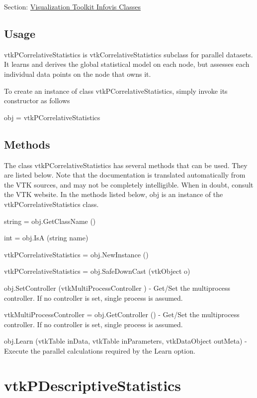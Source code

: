 Section\-: \hyperlink{sec_vtkinfovis}{Visualization Toolkit Infovis Classes} \hypertarget{vtkwidgets_vtkxyplotwidget_Usage}{}\subsection{Usage}\label{vtkwidgets_vtkxyplotwidget_Usage}
vtk\-P\-Correlative\-Statistics is vtk\-Correlative\-Statistics subclass for parallel datasets. It learns and derives the global statistical model on each node, but assesses each individual data points on the node that owns it.

To create an instance of class vtk\-P\-Correlative\-Statistics, simply invoke its constructor as follows \begin{DoxyVerb}  obj = vtkPCorrelativeStatistics
\end{DoxyVerb}
 \hypertarget{vtkwidgets_vtkxyplotwidget_Methods}{}\subsection{Methods}\label{vtkwidgets_vtkxyplotwidget_Methods}
The class vtk\-P\-Correlative\-Statistics has several methods that can be used. They are listed below. Note that the documentation is translated automatically from the V\-T\-K sources, and may not be completely intelligible. When in doubt, consult the V\-T\-K website. In the methods listed below, {\ttfamily obj} is an instance of the vtk\-P\-Correlative\-Statistics class. 
\begin{DoxyItemize}
\item {\ttfamily string = obj.\-Get\-Class\-Name ()}  
\item {\ttfamily int = obj.\-Is\-A (string name)}  
\item {\ttfamily vtk\-P\-Correlative\-Statistics = obj.\-New\-Instance ()}  
\item {\ttfamily vtk\-P\-Correlative\-Statistics = obj.\-Safe\-Down\-Cast (vtk\-Object o)}  
\item {\ttfamily obj.\-Set\-Controller (vtk\-Multi\-Process\-Controller )} -\/ Get/\-Set the multiprocess controller. If no controller is set, single process is assumed.  
\item {\ttfamily vtk\-Multi\-Process\-Controller = obj.\-Get\-Controller ()} -\/ Get/\-Set the multiprocess controller. If no controller is set, single process is assumed.  
\item {\ttfamily obj.\-Learn (vtk\-Table in\-Data, vtk\-Table in\-Parameters, vtk\-Data\-Object out\-Meta)} -\/ Execute the parallel calculations required by the Learn option.  
\end{DoxyItemize}\hypertarget{vtkinfovis_vtkpdescriptivestatistics}{}\section{vtk\-P\-Descriptive\-Statistics}\label{vtkinfovis_vtkpdescriptivestatistics}
